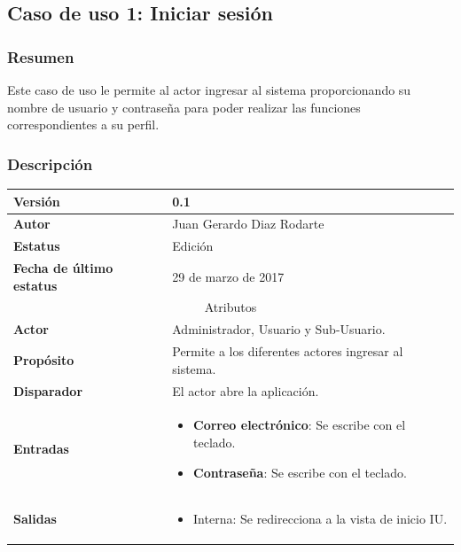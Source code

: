 \subsection{Caso de uso 1: Iniciar sesión} \label{cu1}
\subsubsection{Resumen}
Este caso de uso le permite al actor ingresar al sistema proporcionando su nombre de usuario y contraseña para poder realizar las funciones correspondientes a su perfil.
\subsubsection{Descripción}
\begingroup
\setlength{\LTleft}{-10cm plus -1fill}
\setlength{\LTright}{\LTleft}
\begin{center}  
   \label{tab:cu1_tab}
  \begin{longtable}{| p{3.5cm} | p{11.5cm} |}
      	\hline
      		\textbf{Versión} &  0.1 \\
        \hline 
       		\textbf{Autor} & Juan Gerardo Diaz Rodarte\\
        \hline
          \textbf{Estatus} & Edición \\
        \hline  
          \textbf{Fecha de último estatus} & 29 de marzo de 2017 \\
        \hline
      \multicolumn{2}{|c|}{\large{Atributos}} \\
        \hline
          \textbf{Actor}  & Administrador, Usuario y Sub-Usuario. \\
        \hline	
          \textbf{Propósito} & Permite a los diferentes actores ingresar al sistema. \\
        \hline
          \textbf{Disparador} & El actor abre la aplicación. \\
        \hline	
          \textbf{Entradas} & 
            \begin{itemize}
              \item \textbf{Correo electrónico}: Se escribe con el teclado.
              \item \textbf{Contraseña}: Se escribe con el teclado.
            \end{itemize} \\
        \hline	
          \textbf{Salidas} & 
            \begin{itemize}
              \item Interna: Se redirecciona a la vista de inicio IU.

\end{itemize}
\end{longtable}
\end{center}
